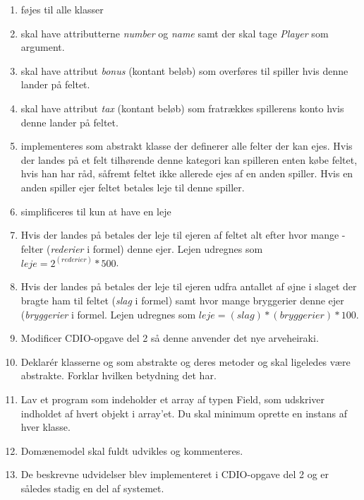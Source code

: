 \begin{enumerate}
\item {} føjes til alle klasser
\item {} skal have attributterne \textit{number} og \textit{name} samt  der skal tage \textit{Player} som argument.
\item {} skal have attribut \textit{bonus} (kontant beløb) som overføres til spiller hvis denne lander på feltet.
\item {} skal have attribut \textit{tax} (kontant beløb) som fratrækkes spillerens konto hvis denne lander på feltet.
\item {} implementeres som abstrakt klasse der definerer alle felter der kan ejes. Hvis der landes på et felt tilhørende denne kategori kan spilleren enten købe feltet, hvis han har råd, såfremt feltet ikke allerede ejes af en anden spiller. Hvis en anden spiller ejer feltet betales leje til denne spiller.
\item {} simplificeres til kun at have en leje 
\item Hvis der landes på  betales der leje til ejeren af feltet alt efter hvor mange -felter (\textit{rederier} i formel) denne ejer. Lejen udregnes som $leje=2^{(rederier)}*500$.
\item Hvis der landes på  betales der leje til ejeren udfra antallet af øjne i slaget der bragte ham til feltet (\textit{slag} i formel) samt hvor mange bryggerier denne ejer (\textit{bryggerier} i formel. Lejen udregnes som $leje=(slag)*(bryggerier)*100$.
\item Modificer CDIO-opgave del 2 så denne anvender det nye arveheiraki.
\item Deklarér klasserne  og  som abstrakte og deres metoder  og  skal ligeledes være abstrakte. Forklar hvilken betydning det har.
\item Lav et program  som indeholder et array af typen Field, som udskriver indholdet af hvert objekt i array’et. Du skal minimum oprette en instans af hver klasse.
\item Domænemodel skal fuldt udvikles og kommenteres.  
\item De beskrevne udvidelser blev implementeret i CDIO-opgave del 2 og er således stadig en del af systemet. 
\end{enumerate}
 
